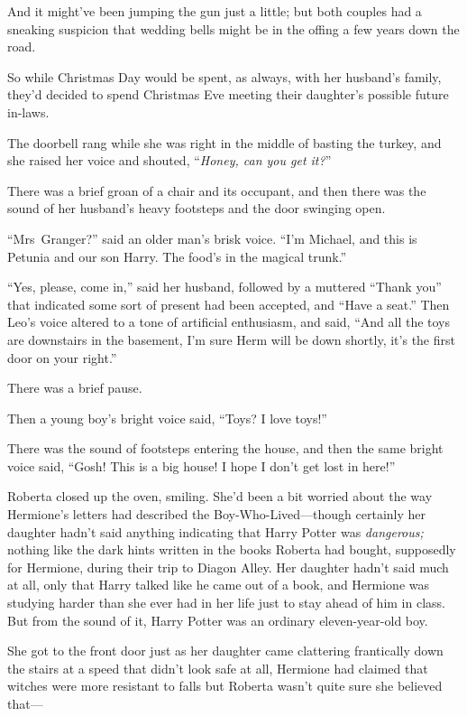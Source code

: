 And it might’ve been jumping the gun just a little; but both couples had a sneaking suspicion that wedding bells might be in the offing a few years down the road.

So while Christmas Day would be spent, as always, with her husband’s family, they’d decided to spend Christmas Eve meeting their daughter’s possible future in-laws.

The doorbell rang while she was right in the middle of basting the turkey, and she raised her voice and shouted, “\emph{Honey, can you get it?}”

There was a brief groan of a chair and its occupant, and then there was the sound of her husband’s heavy footsteps and the door swinging open.

“Mrs~Granger?” said an older man’s brisk voice. “I’m Michael, and this is Petunia and our son Harry. The food’s in the magical trunk.”

“Yes, please, come in,” said her husband, followed by a muttered “Thank you” that indicated some sort of present had been accepted, and “Have a seat.” Then Leo’s voice altered to a tone of artificial enthusiasm, and said, “And all the toys are downstairs in the basement, I’m sure Herm will be down shortly, it’s the first door on your right.”

There was a brief pause.

Then a young boy’s bright voice said, “Toys? I love toys!”

There was the sound of footsteps entering the house, and then the same bright voice said, “Gosh! This is a big house! I hope I don’t get lost in here!”

Roberta closed up the oven, smiling. She’d been a bit worried about the way Hermione’s letters had described the Boy-Who-Lived—though certainly her daughter hadn’t said anything indicating that Harry Potter was \emph{dangerous;} nothing like the dark hints written in the books Roberta had bought, supposedly for Hermione, during their trip to Diagon Alley. Her daughter hadn’t said much at all, only that Harry talked like he came out of a book, and Hermione was studying harder than she ever had in her life just to stay ahead of him in class. But from the sound of it, Harry Potter was an ordinary eleven-year-old boy.

She got to the front door just as her daughter came clattering frantically down the stairs at a speed that didn’t look safe at all, Hermione had claimed that witches were more resistant to falls but Roberta wasn’t quite sure she believed that—

